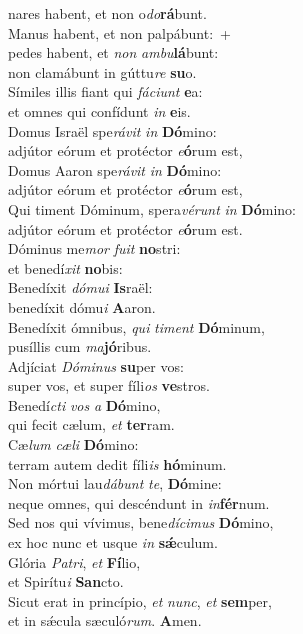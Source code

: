 {nares habent, et non o\textit{do}\textbf{rá}bunt.\\
\vin Manus habent, et non palpábunt:~+\\
\vin  pedes habent, et \textit{non} \textit{am}\textit{bu}\textbf{lá}bunt:~\*\\
\vin non clamábunt in gúttu\textit{re} \textbf{su}o.\\
Símiles illis fiant qui \textit{fá}\textit{ci}\textit{unt} \textbf{e}a:~\*\\
et omnes qui confídunt \textit{in} \textbf{e}is.\\
\vin Domus Israël spe\textit{rá}\textit{vit} \textit{in} \textbf{Dó}mino:~\*\\
\vin adjútor eórum et protéctor \textit{e}\textbf{ó}rum est,\\
Domus Aaron spe\textit{rá}\textit{vit} \textit{in} \textbf{Dó}mino:~\*\\
adjútor eórum et protéctor \textit{e}\textbf{ó}rum est,\\
\vin Qui timent Dóminum, spera\textit{vé}\textit{runt} \textit{in} \textbf{Dó}mino:~\*\\
\vin adjútor eórum et protéctor \textit{e}\textbf{ó}rum est.\\
Dóminus me\textit{mor} \textit{fu}\textit{it} \textbf{no}stri:~\*\\
et benedí\textit{xit} \textbf{no}bis:\\
\vin Benedíxit \textit{dó}\textit{mu}\textit{i} \textbf{Is}raël:~\*\\
\vin benedíxit dómu\textit{i} \textbf{A}aron.\\
Benedíxit ómnibus, \textit{qui} \textit{ti}\textit{ment} \textbf{Dó}minum,~\*\\
pusíllis cum \textit{ma}\textbf{jó}ribus.\\
\vin Adjíciat \textit{Dó}\textit{mi}\textit{nus} \textbf{su}per vos:~\*\\
\vin super vos, et super fíli\textit{os} \textbf{ve}stros.\\
Benedí\textit{cti} \textit{vos} \textit{a} \textbf{Dó}mino,~\*\\
qui fecit cælum, \textit{et} \textbf{ter}ram.\\
\vin Cæ\textit{lum} \textit{cæ}\textit{li} \textbf{Dó}mino:~\*\\
\vin terram autem dedit fíli\textit{is} \textbf{hó}minum.\\
Non mórtui lau\textit{dá}\textit{bunt} \textit{te}, \textbf{Dó}mine:~\*\\
neque omnes, qui descéndunt in \textit{in}\textbf{fér}num.\\
\vin Sed nos qui vívimus, bene\textit{dí}\textit{ci}\textit{mus} \textbf{Dó}mino,~\*\\
\vin ex hoc nunc et usque \textit{in} \textbf{sǽ}culum.\\
Glória \textit{Pa}\textit{tri}, \textit{et} \textbf{Fí}lio,~\*\\
et Spirítu\textit{i} \textbf{San}cto.\\
\vin Sicut erat in princípio, \textit{et} \textit{nunc}, \textit{et} \textbf{sem}per,~\*\\
\vin et in sǽcula sæculó\textit{rum}. \textbf{A}men.\\
}


